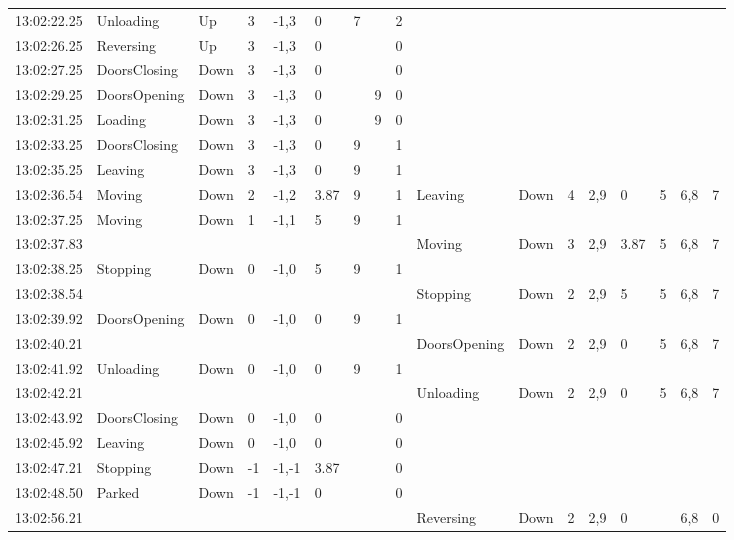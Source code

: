\documentclass{UoYCSproject}
\begin{document}
\begin{appendices}
\begin{landscape}
\begin{longtable}{l || l | l | l | l | l | l | l | l || l | l | l | l | l | l | l | l}
	13:02:22.25 & Unloading & Up & 3 & -1,3 & 0 & 7 &  & 2 &  &  &  &  &  &  &  &  \\
	13:02:26.25 & Reversing & Up & 3 & -1,3 & 0 &  &  & 0 &  &  &  &  &  &  &  &  \\
	13:02:27.25 & DoorsClosing & Down & 3 & -1,3 & 0 &  &  & 0 &  &  &  &  &  &  &  &  \\
	13:02:29.25 & DoorsOpening & Down & 3 & -1,3 & 0 &  & 9 & 0 &  &  &  &  &  &  &  &  \\
	13:02:31.25 & Loading & Down & 3 & -1,3 & 0 &  & 9 & 0 &  &  &  &  &  &  &  &  \\
	13:02:33.25 & DoorsClosing & Down & 3 & -1,3 & 0 & 9 &  & 1 &  &  &  &  &  &  &  &  \\
	13:02:35.25 & Leaving & Down & 3 & -1,3 & 0 & 9 &  & 1 &  &  &  &  &  &  &  &  \\
	13:02:36.54 & Moving & Down & 2 & -1,2 & 3.87 & 9 &  & 1 & Leaving & Down & 4 & 2,9 & 0 & 5 & 6,8 & 7 \\
	13:02:37.25 & Moving & Down & 1 & -1,1 & 5 & 9 &  & 1 &  &  &  &  &  &  &  &  \\
	13:02:37.83 &  &  &  &  &  &  &  &  & Moving & Down & 3 & 2,9 & 3.87 & 5 & 6,8 & 7 \\
	13:02:38.25 & Stopping & Down & 0 & -1,0 & 5 & 9 &  & 1 &  &  &  &  &  &  &  &  \\
	13:02:38.54 &  &  &  &  &  &  &  &  & Stopping & Down & 2 & 2,9 & 5 & 5 & 6,8 & 7 \\
	13:02:39.92 & DoorsOpening & Down & 0 & -1,0 & 0 & 9 &  & 1 &  &  &  &  &  &  &  &  \\
	13:02:40.21 &  &  &  &  &  &  &  &  & DoorsOpening & Down & 2 & 2,9 & 0 & 5 & 6,8 & 7 \\
	13:02:41.92 & Unloading & Down & 0 & -1,0 & 0 & 9 &  & 1 &  &  &  &  &  &  &  &  \\
	13:02:42.21 &  &  &  &  &  &  &  &  & Unloading & Down & 2 & 2,9 & 0 & 5 & 6,8 & 7 \\
	13:02:43.92 & DoorsClosing & Down & 0 & -1,0 & 0 &  &  & 0 &  &  &  &  &  &  &  &  \\
	13:02:45.92 & Leaving & Down & 0 & -1,0 & 0 &  &  & 0 &  &  &  &  &  &  &  &  \\
	13:02:47.21 & Stopping & Down & -1 & -1,-1 & 3.87 &  &  & 0 &  &  &  &  &  &  &  &  \\
	13:02:48.50 & Parked & Down & -1 & -1,-1 & 0 &  &  & 0 &  &  &  &  &  &  &  &  \\
	13:02:56.21 &  &  &  &  &  &  &  &  & Reversing & Down & 2 & 2,9 & 0 &  & 6,8 & 0 \\

\end{longtable}
\end{landscape}
\end{appendices}
\end{document}

